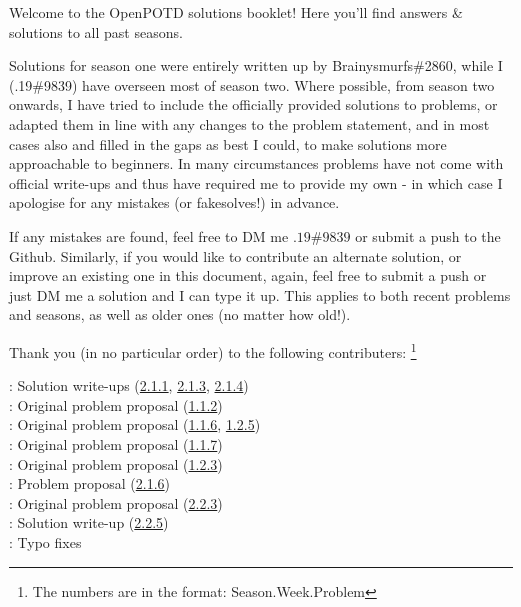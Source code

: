 Welcome to the OpenPOTD solutions booklet! Here you'll find answers \& solutions to all past seasons.\medskip

Solutions for season one were entirely written up by Brainysmurfs\#2860, while I (.19\#9839) have overseen most of season two. 
Where possible, from season two onwards, I have tried to include the officially provided solutions to problems, 
or adapted them in line with any changes to the problem statement, and in most cases also and filled 
in the gaps as best I could, to make solutions more approachable to beginners. 
In many circumstances problems have not come with official write-ups and thus have required me to provide my own -
 in which case I apologise for any mistakes (or fakesolves!) in advance.\medskip

If any mistakes are found, feel free to DM me \(.19\#9839\) or submit a push to the Github.
Similarly, if you would like to contribute an alternate solution, or improve an existing one in this document,
 again, feel free to submit a push or just DM me a solution and I can type it up. 
This applies to both recent problems and seasons, as well as older ones (no matter how old!).\bigskip 


Thank you (in no particular order) to the following contributers:
\footnote{The numbers are in the format: Season.Week.Problem}\medskip

\Paiya: Solution write-ups (\hyperref[2-1-1]{2.1.1}, \hyperref[2-1-3]{2.1.3}, \hyperref[2-1-4]{2.1.4})\\
\Ptony: Original problem proposal (\hyperref[1-1-2]{1.1.2})\\
\Ppi: Original problem proposal (\hyperref[1-1-6]{1.1.6}, \hyperref[1-2-5]{1.2.5})\\
\Pbfan: Original problem proposal (\hyperref[1-1-7]{1.1.7})\\
\Pkiesh: Original problem proposal (\hyperref[1-2-3]{1.2.3})\\
\Pchris: Problem proposal (\hyperref[2-1-6]{2.1.6})\\
\Pkee: Original problem proposal (\hyperref[2-2-3]{2.2.3})\\
\PSlas: Solution write-up (\hyperref[2-2-5]{2.2.5})\\
\Parjun: Typo fixes